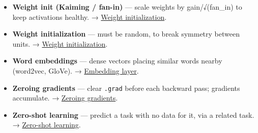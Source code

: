 \documentclass[
  10pt,
  letterpaper,
  onecolumn]{article}
\begin{document}
\begin{itemize}
  \protect\hyperlink{weight-decay-and-parameter-norm-penalties}{Weight
  decay and parameter norm penalties}.
\item
  \textbf{Weight init (Kaiming / fan-in)} --- scale weights by
  gain/√(fan\_in) to keep activations healthy. →
  \protect\hyperlink{weight-initialization}{Weight initialization}.
\item
  \textbf{Weight initialization} --- must be random, to break symmetry
  between units. → \protect\hyperlink{weight-initialization}{Weight
  initialization}.
\item
  \textbf{Word embeddings} --- dense vectors placing similar words
  nearby (word2vec, GloVe). →
  \protect\hyperlink{embedding-layer}{Embedding layer}.
\item
  \textbf{Zeroing gradients} --- clear \texttt{.grad} before each
  backward pass; gradients accumulate. →
  \protect\hyperlink{zeroing-gradients}{Zeroing gradients}.
\item
  \textbf{Zero-shot learning} --- predict a task with no data for it,
  via a related task. → \protect\hyperlink{zero-shot-learning}{Zero-shot
  learning}.
\end{itemize}
\end{document}

